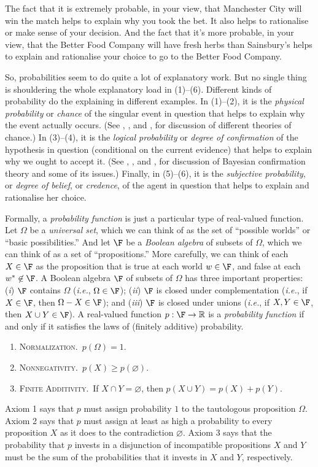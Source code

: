 The fact that it is extremely probable, in your view, that Manchester City will win the match helps to explain why you took the bet. It also helps to rationalise or make sense of your decision. And the fact that it's more probable, in your view, that the Better Food Company will have fresh herbs than Sainsbury's helps to explain and rationalise your choice to go to the Better Food Company.

So, probabilities seem to do quite a lot of explanatory work. But no single thing is shouldering the whole explanatory load in (1)--(6). Different kinds of probability do the explaining in different examples. In (1)--(2), it is the \emph{physical probability} or \emph{chance} of the singular event in question that helps to explain why the event actually occurs. (See \citealp{Hajek2009b}, \citealp{Gillies2000}, and \citealp{Hitchcock2012}, for discussion of different theories of chance.) In (3)--(4), it is the \emph{logical probability} or \emph{degree of confirmation} of the hypothesis in question (conditional on the current evidence) that helps to explain why we ought to accept it. (See \citealp{Earman1992}, \citealp{Hajek2008}, and \citealp{Paris2011}, for discussion of Bayesian confirmation theory and some of its issues.) Finally, in (5)--(6), it is the \emph{subjective probability}, or \emph{degree of belief}, or \emph{credence}, of the agent in question that helps to explain and rationalise her choice.

Formally, a \emph{probability function} is just a particular type of real-valued function. Let $\Omega$ be a \emph{universal set}, which we can think of as the set of ``possible worlds'' or ``basic possibilities.'' And let $\F$ be a \emph{Boolean algebra} of subsets of $\Omega$, which we can think of as a set of ``propositions.'' More carefully, we can think of each $X\in\F$ as the proposition that is true at each world $w\in\F$, and false at each $w^*\not\in\F$. A Boolean algebra $\F$ of subsets of $\Omega$ has three important properties: (\emph{i}) $\F$ contains $\Omega$ (\emph{i.e.}, $\Omega\in\F$); (\emph{ii}) $\F$ is closed under complementation (\emph{i.e.}, if $X\in\F$, then $\Omega-X\in\F$); and (\emph{iii}) $\F$ is closed under unions (\emph{i.e.}, if $X,Y\in\F$, then $X\cup Y\in\F$). A real-valued function $p:\F\rightarrow\mathbb{R}$ is a \emph{probability function} if and only if it satisfies the laws of (finitely additive) probability.
\begin{enumerate}
\item\textsc{Normalization.}\, $p(\Omega)=1$.
\item\textsc{Nonnegativity.}\, $p(X)\geq p(\varnothing)$.
\item\textsc{Finite Additivity.}\, If $X\cap Y=\varnothing$, then $p(X\cup Y)=p(X)+p(Y)$.
\end{enumerate}
Axiom 1 says that $p$ must assign probability $1$ to the tautologous proposition $\Omega$. Axiom 2 says that $p$ must assign at least as high a probability to every proposition $X$ as it does to the contradiction $\varnothing$. Axiom 3 says that the probability that $p$ invests in a disjunction of incompatible propositions $X$ and $Y$ must be the sum of the probabilities that it invests in $X$ and $Y$, respectively.

